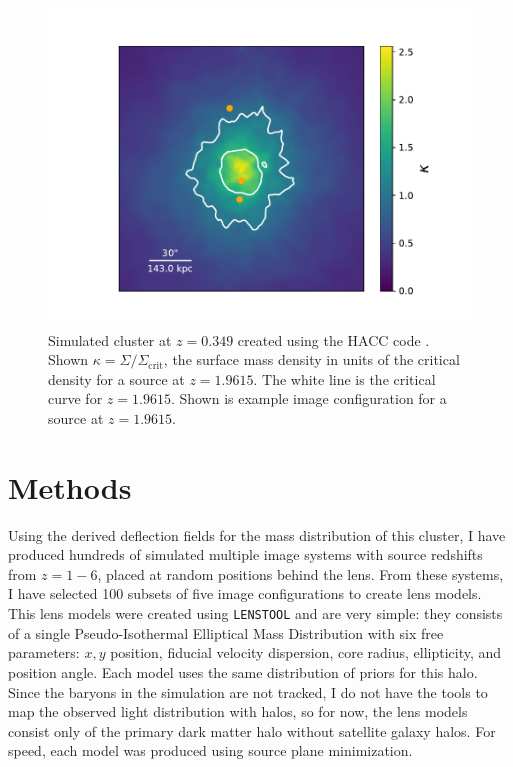 \begin{figure}
\centering
\includegraphics[width=\textwidth,trim={0 33pt 0 40pt},clip]{Chap6/cluster.pdf}
\caption[Simulated cluster from created using HACC]{Simulated cluster at $z=0.349$ created using the HACC code \citep{Habib:2016cy}. Shown $\kappa=\Sigma/\Sigma_\mathrm{crit}$, the surface mass density in units of the critical density for a source at $z=1.9615$. The white line is the critical curve for $z=1.9615$. Shown is example image configuration for a source at $z=1.9615$.}
\label{chap6:fig:cluster}
\end{figure}

\section{Methods}

Using the derived deflection fields for the mass distribution of this cluster, I have produced hundreds of simulated multiple image systems with source redshifts from $z=1-6$, placed at random positions behind the lens. From these systems, I have selected 100 subsets of five image configurations to create lens models. This lens models were created using \texttt{LENSTOOL} and are very simple: they consists of a single Pseudo-Isothermal Elliptical Mass Distribution with six free parameters: $x,y$ position, fiducial velocity dispersion, core radius, ellipticity, and position angle. Each model uses the same distribution of priors for this halo. Since the baryons in the simulation are not tracked, I do not have the tools to map the observed light distribution with halos, so for now, the lens models consist only of the primary dark matter halo without satellite galaxy halos. For speed, each model was produced using source plane minimization.


